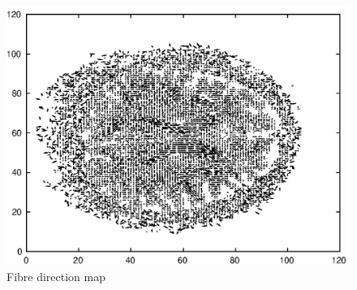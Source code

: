 \documentclass[11pt,a4paper,oneside]{report}
\begin{document}
\begin{figure}[H]
      \centering
    \includegraphics[scale=1]{figures/q1/q114-fbDir.eps}
    \caption{Fibre direction map}
    \label{q114-fbDir}
\end{figure}
\end{document}
